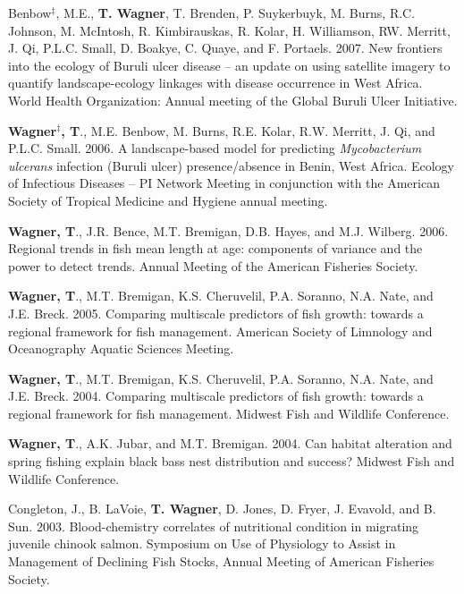 \documentclass[10pt]{article}
\begin{document}
\begin{flushleft}
\begin{etaremune}
\item Benbow$^\ddagger$, M.E., {\bf T. Wagner}, T. Brenden, P. Suykerbuyk, M. Burns, R.C. Johnson, M. McIntosh, R. Kimbirauskas, R. Kolar, H. Williamson, RW. Merritt, J. Qi, P.L.C. Small, D. Boakye, C. Quaye, and F. Portaels. 2007. New frontiers into the ecology of Buruli ulcer disease – an update on using satellite imagery to quantify landscape-ecology linkages with disease occurrence in West Africa. World Health Organization: Annual meeting of the Global Buruli Ulcer Initiative.


\item {\bf Wagner$^\ddagger$, T}., M.E. Benbow, M. Burns, R.E. Kolar, R.W. Merritt, J. Qi, and P.L.C. Small. 2006. A landscape-based model for predicting \emph{Mycobacterium ulcerans} infection (Buruli ulcer) presence/absence in Benin, West Africa. Ecology of Infectious Diseases – PI Network Meeting in conjunction with the American Society of Tropical Medicine and Hygiene annual meeting. 

\item {\bf Wagner, T}., J.R. Bence, M.T. Bremigan, D.B. Hayes, and M.J. Wilberg. 2006. Regional trends in fish mean length at age: components of variance and the power to detect trends. Annual Meeting of the American Fisheries Society. 


\item {\bf Wagner, T}., M.T. Bremigan, K.S. Cheruvelil, P.A. Soranno, N.A. Nate, and J.E. Breck. 2005. Comparing multiscale predictors of fish growth: towards a regional framework for fish management. American Society of Limnology and Oceanography Aquatic Sciences Meeting. 


\item {\bf Wagner, T}., M.T. Bremigan, K.S. Cheruvelil, P.A. Soranno, N.A. Nate, and J.E. Breck. 2004. Comparing multiscale predictors of fish growth: towards a regional framework for fish management. Midwest Fish and Wildlife Conference.

\item {\bf Wagner, T}., A.K. Jubar, and M.T. Bremigan. 2004. Can habitat alteration and spring fishing explain black bass nest distribution and success? Midwest Fish and Wildlife Conference.


\item Congleton, J., B. LaVoie, {\bf T. Wagner}, D. Jones, D. Fryer, J. Evavold, and B. Sun. 2003. Blood-chemistry correlates of nutritional condition in migrating juvenile chinook salmon. Symposium on Use of Physiology to Assist in Management of Declining Fish Stocks, Annual Meeting of American Fisheries Society.


\end{etaremune}
\end{flushleft}
\end{document}
